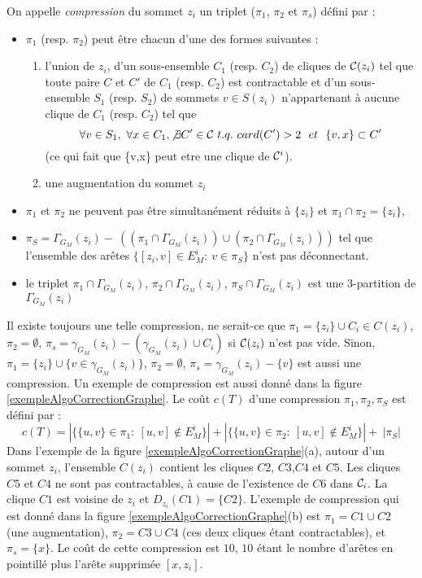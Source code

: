 \begin{definition}
On appelle {\em compression} du sommet $z_i$ un triplet ($\pi_1$, $\pi_2$ et $\pi_s$) d\'efini par : 
\begin{itemize}
	\item $\pi_1$ (resp. $\pi_2$) peut \^etre  chacun d'une des formes suivantes :
	\begin{enumerate}
		\item l'union de $z_i$, d'un sous-ensemble $C_1$ (resp. $C_2$) de cliques de ${\cal C}(z_i)$ tel que toute paire $C$ et $C'$ de $C_1$ (resp. $C_2$) est contractable et d'un sous-ensemble $S_1$ (resp. $S_2$) de sommets $v \in S(z_i)$ n'appartenant \`a aucune clique de $C_1$ (resp. $C_2$) tel que
		$$ \forall v \in S_1,~\forall x \in C_1, \not\exists C' \in {\cal C}~t.q.~card(C')>2~~et~~\{v,x\} \subset C'$$
		(ce qui fait que \{v,x\} peut etre une clique de ${\cal C}^i$).
		\item une augmentation du sommet $z_i$
	\end{enumerate}
	\item $\pi_1$ et $\pi_2$ ne peuvent pas \^etre simultan\'ement r\'eduits \`a $\{z_i\}$ et $\pi_1 \cap \pi_2 = \{z_i\}$,
	\item $\pi_S=\Gamma_{G_M}(z_i)-~((\pi_1 \cap \Gamma_{G_M}(z_i) ) \cup(\pi_2 \cap \Gamma_{G_M}(z_i) ))$ tel que l'ensemble des ar\^etes  $\{[z_i,v]\in E_{M}^{i}:~v\in \pi_S\}$ n'est pas d\'econnectant.
	\item le triplet $\pi_{1} \cap \Gamma_{G_M}(z_i)$, $\pi_{2} \cap \Gamma_{G_M}(z_i)$, $\pi_{S} \cap \Gamma_{G_M}(z_i)$  est une 3-partition de $\Gamma_{G_M}(z_i)$
\end{itemize}
\end{definition}
Il existe toujours une telle compression, ne serait-ce que 
$\pi_1 = \{z_i\} \cup C_i \in C(z_i)$, 
$\pi_2 =  \emptyset$,
$\pi_s = \gamma_{G_M}(z_i) -(\gamma_{G_M}(z_i) \cup C_i) $  si ${\cal C}(z_i)$ n'est pas vide.
Sinon, 
$\pi_1 = \{z_i\} \cup \{ v \in \gamma_{G_M}(z_i)  \} $, 
$\pi_2 =  \emptyset$,
$\pi_s = \gamma_{G_M}(z_i) - \{v\} $
est aussi une compression.
Un exemple de compression est aussi donn\'e dans la figure \ref{exempleAlgoCorrectionGraphe}.
Le co\^ut $c(T)$ d'une compression $\pi_{1},\pi_{2},\pi_{S}$ est d\'efini par : 
$$c(T) = | \{\{u,v\} \in \pi_{1}:~[u,v]\not\in E_{M}^{i}\}| + |\{\{u,v\} \in \pi_2:~[u,v]\not\in E_{M}^{i}\}| +~ |\pi_S| $$
Dans l'exemple de la figure \ref{exempleAlgoCorrectionGraphe}(a), autour d'un sommet $z_i$, l'ensemble $C(z_i)$ contient les cliques $C2$, $C3$,$C4$ et $C5$.
Les cliques $C5$ et $C4$ ne sont pas contractables, \`a cause de l'existence de $C6$ dans ${\cal C}_i$.
La clique $C1$ est voisine de $z_i$ et $D_{z_i}(C1) = \{C2\}$.
L'exemple de compression qui est donn\'e dans la figure \ref{exempleAlgoCorrectionGraphe}(b) est $\pi_1 = C1 \cup C2$ (une augmentation), $\pi_2 = C3 \cup C4$ (ces deux cliques \'etant contractables), et $\pi_s = \{x\}$.
Le co\^ut  de cette compression est $10$, $10$ \'etant le nombre d'ar\^etes en pointill\'e plus l'ar\^ete supprim\'ee $[x,z_i]$.
\newline

